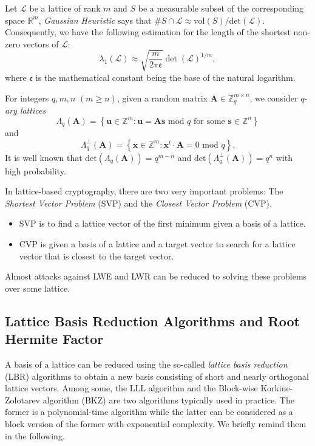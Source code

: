 \documentclass{cta-author}
\begin{document}
Let $\mathcal{L}$ be a lattice of rank $m$ and $S$ be a measurable subset of the  corresponding space $\mathbb{R}^m$, \textit{Gaussian Heuristic} says that  
$\#S \cap \mathcal{L} \approx \text{vol}(S)/\text{det} (\mathcal{L}).$
Consequently, we have the following estimation for the length of the shortest non-zero vectors of $\mathcal{L}$:
\begin{equation*} \label{eqq1}
\lambda_1(\mathcal{L}) \approx \sqrt{\frac{m}{2\pi \mathfrak{e}}}\det(\mathcal{L})^{1/m},
\end{equation*}
where $\mathfrak{e}$ is the mathematical constant being the base of the natural logarithm.


For integers $q, m, n$ $(m \geq n)$, given a random matrix $\mathbf{A} \in \mathbb{Z}_q^{m \times n}$, we consider $q$-\textit{ary lattices}
$$\Lambda_q{(\mathbf{A})}=\left\{ \mathbf{u} \in \mathbb{Z}^m: \mathbf{u}=\mathbf{A}\mathbf{s} \text{ mod } q \text{ for some } \mathbf{s} \in \mathbb{Z}^n \right\}$$ and $$\Lambda_q^{\bot}{(\mathbf{A})}=\left\{ \mathbf{x} \in \mathbb{Z}^m:\mathbf{x}^t\cdot \mathbf{A}=0 \text{ mod } q \right\}.$$
It is well known that $\text{det}(\Lambda_q(\mathbf{A})) = q^{m-n}$ and $\text{det}(\Lambda_q^{\bot}(\mathbf{A})) = q^{n}$ with high probability.



In lattice-based cryptography, there are two very important problems: The \textit{Shortest Vector Problem} (SVP) and the \textit{Closest Vector Problem} (CVP).
\begin{itemize}
	\item SVP is to find a lattice vector of the first minimum given a basis of a lattice. 
	\item  CVP is given a basis of a lattice and a target vector to search for a lattice vector that is closest to the target vector.
\end{itemize}
Almost attacks against LWE and LWR can be reduced to solving these problems over some lattice. 
\subsection{Lattice Basis Reduction Algorithms and Root Hermite Factor} \label{sec2.2}
A basis of a lattice can be reduced using the so-called \textit{lattice basis reduction} (LBR) algorithms to obtain a new basis consisting of short and nearly orthogonal lattice vectors. Among some, the LLL algorithm \cite{LLL82} and the Block-wise Korkine-Zolotarev algorithm (BKZ) \cite{SE94} are two algorithms typically used in practice. The former is a polynomial-time algorithm while the latter can be considered as a block version of the former with exponential complexity. We briefly remind them in the following. 
\end{document}
